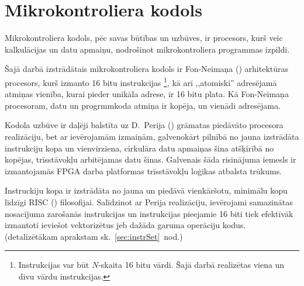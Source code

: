 \section{Mikrokontroliera kodols} \label{sec:cpu}
	Mikrokontroliera kodols, pēc savas būtības un uzbūves, ir procesors,
	kurš veic kalkulācijas un datu apmaiņu, nodrošinot mikrokontroliera
	programmas izpildi.
	
	Šajā darbā izstrādātais mikrokontroliera kodols ir 
	Fon-Neimaņa () arhitektūras pro\-ce\-sors, kurš
	izmanto 16 bitu instrukcijas%
		\footnote{Instrukcijas var būt $N$-skaita 16 bitu vārdi. 
		Šajā darbā realizētas viena un divu vārdu instrukcijas.},
	kā arī ,,atomiski'' adresējamā atmiņas vienība, kurai pieder unikāla
	adrese, ir 16 bitu plata. Kā Fon-Neimaņa procesoram, datu un
	progrmmkoda atmiņa ir kopēja, un vienādi adresējama.
	
	Kodola uzbūve ir daļēji balstīta uz D.~Perija () grāmatas%
	 piedāvāto procesora reali\-zā\-ciju, 
	bet ar ievērojamām izmaiņām, galvenokārt pilnībā no jauna izstrādāta 
	instrukciju kopa un vienvirziena,
	cirkulāra datu apmaiņas šina atšķirībā no kopējas,
	trīs\-stāvokļu arbitējamas datu šinas. Galvenais šāda risinājuma iemesls
	ir izmantojamās  FPGA darba platformas trīs\-stāvokļu
	loģikas atbalsta \mbox{trūkums.\cite[18.~lpp.]{FusionFAQ}}
	
	Instruckiju kopa ir izstrādāta no jauna un piedāvā vienkāršotu,
	mini\-mālu kopu līdzīgi RISC ()
	filo\-so\-fijai. Salīdzinot ar Perija realizāciju, ievērojami samazinātas
	nosacījuma zarošanās instrukcijas un instrukcijas pieejamie 16 biti
	tiek efektīvāk izmantoti ieviešot vektorizētus jeb dažāda garuma
	operāciju kodus. (detalizētākam aprakstam sk.~\ref{sec:instrSet}~nod.)
	
	
	
	
	
